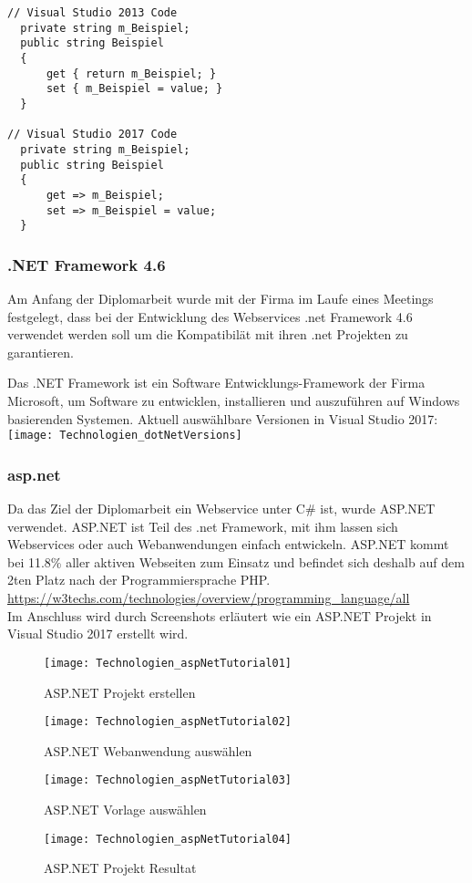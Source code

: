 \begin{lstlisting}[caption=Syntax Unterschied: Property , label=lst:test]
// Visual Studio 2013 Code
  private string m_Beispiel;
  public string Beispiel
  {
      get { return m_Beispiel; }
      set { m_Beispiel = value; }
  }

// Visual Studio 2017 Code
  private string m_Beispiel;
  public string Beispiel
  {
      get => m_Beispiel;
      set => m_Beispiel = value;
  }
\end{lstlisting}

\subsubsection {.NET Framework 4.6}
\label{sec:.NETFramework4.6}
Am Anfang der Diplomarbeit wurde mit der Firma im Laufe eines Meetings festgelegt, dass bei der Entwicklung des Webservices .net Framework 4.6 verwendet werden soll um die Kompatibilät mit ihren .net Projekten zu garantieren.

Das .NET Framework ist ein Software Entwicklungs-Framework der Firma Microsoft, um Software zu entwicklen, installieren und auszuführen auf Windows basierenden Systemen. 
Aktuell auswählbare Versionen in Visual Studio 2017:\\ 

\centering \texttt{[image: Technologien\_dotNetVersions]}

\justifying
\subsubsection {asp.net}
\label{sec:asp.net}
Da das Ziel der Diplomarbeit ein Webservice unter C\# ist, wurde ASP.NET verwendet. ASP.NET ist Teil des .net Framework, mit ihm lassen sich Webservices oder auch Webanwendungen einfach entwickeln. ASP.NET kommt bei 11.8\% aller aktiven Webseiten zum Einsatz und befindet sich deshalb auf dem 2ten Platz nach der Programmiersprache PHP. 
\url {https://w3techs.com/technologies/overview/programming_language/all} 
\\
Im Anschluss wird durch Screenshots erläutert wie ein ASP.NET Projekt in Visual Studio 2017 erstellt wird.

\begin{figure}[H]
    \centering
    \texttt{[image: Technologien\_aspNetTutorial01]}
    \caption{ASP.NET Projekt erstellen}
    \label{fig:aspNetTut01}

    \centering
    \texttt{[image: Technologien\_aspNetTutorial02]}
    \caption{ASP.NET Webanwendung auswählen}
    \label{fig:aspNetTut02}
\end{figure}
\begin{figure}[H]
    \centering
    \texttt{[image: Technologien\_aspNetTutorial03]}
    \caption{ASP.NET Vorlage auswählen}
    \label{fig:aspNetTut03}

    \centering
    \texttt{[image: Technologien\_aspNetTutorial04]}
    \caption{ASP.NET Projekt Resultat}
    \label{fig:aspNetTut04}
\end{figure}

